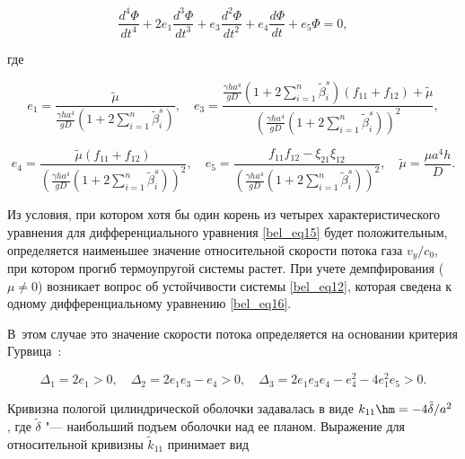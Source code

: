 \begin{equation}\label{bel_eq16}

\frac{d^4\varPhi}{dt^4}+2 e_1\frac{d^3\varPhi}{dt^3}+e_3\frac{d^2\varPhi}{dt^2}+e_4\frac{d\varPhi}{dt}+e_5\varPhi=0,

\end{equation}

где

\begin{equation*}

e_1=\frac{\tilde{\mu} }{ \frac{\gamma h a^4}{g D}\left(1+2\sum_{i=1}^n\tilde{\beta}_i^s \right) }, \quad e_3=\frac{\frac{\gamma h a^4}{g D}\left(1+2\sum_{i=1}^n\tilde{\beta}_i^s \right)\left( f_{11}+f_{12}\right)+ \tilde{\mu}}{\left( \frac{\gamma h a^4}{g D}\left(1+2\sum_{i=1}^n\tilde{\beta}_i^s \right)\right)^2},

\end{equation*}

\begin{equation*}

e_4=\frac{\tilde{\mu}\left(f_{11}+f_{12} \right)  }{\left(  \frac{\gamma h a^4}{g D}\left(1+2\sum_{i=1}^n\tilde{\beta}_i^s \right)\right)^2},\quad e_5=\frac{f_{11} f_{12}-\xi_{21}\xi_{12}}{\left( \frac{\gamma h a^4}{g D}\left(1+2\sum_{i=1}^n\tilde{\beta}_i^s \right)\right)^2}, \quad \tilde{\mu}=\frac{\mu a^4 h}{D}.

\end{equation*}



Из условия, при котором хотя бы один корень из четырех  характеристического уравнения для дифференциального уравнения \eqref{bel_eq15} будет положительным, определяется наименьшее значение  относительной скорости потока газа ${v_y}/{c_0}$, при котором прогиб термоупругой системы растет. При учете демпфирования ($\mu\neq0$) возникает вопрос об устойчивости системы \eqref{bel_eq12}, которая сведена к одному дифференциальному уравнению \eqref{bel_eq16}. 

В~этом случае это значение скорости потока определяется на основании критерия Гурвица~\cite{myl-bib:32}:

\begin{equation*}

\Delta_1=2e_1>0, \quad \Delta_2=2e_1e_3-e_4>0, \quad \Delta_3=2e_1e_3e_4-e_4^2-4e_1^2e_5>0.

\end{equation*}



Кривизна пологой цилиндрической оболочки задавалась в виде $k_{11}\hm=-{4 \tilde{\delta}}/{a^2}$ \cite{myl-bib:33, myl-bib:34}, где $\tilde{\delta}$ "--- наибольший подъем оболочки над ее планом. Выражение для относительной кривизны $\tilde{k}_{11}$ принимает вид

